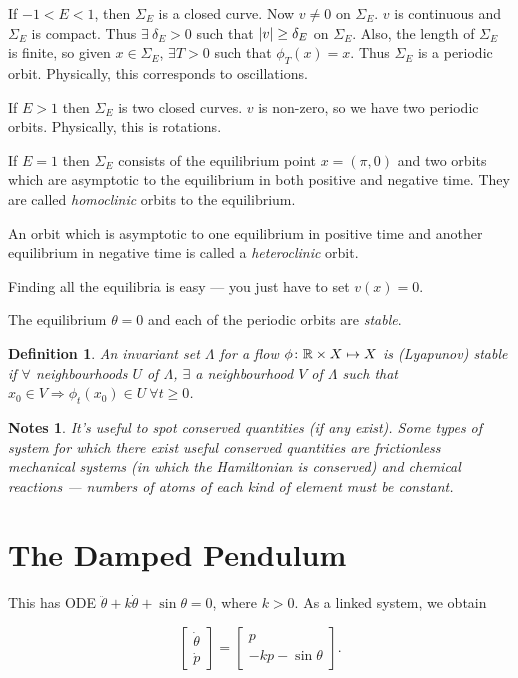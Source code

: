 \documentclass{notes}
\theoremstyle{plain}
\newtheorem*{definition}{Definition}
\newtheorem*{notes}{Notes}
\begin{document}
If $-1 < E < 1$, then $\Sigma_E$ is a closed curve.  Now $v \neq 0$ on
$\Sigma_E$.  $v$ is continuous and $\Sigma_E$ is compact.  Thus
$\exists\ \delta_E > 0$ such that $\left|v\right| \ge \delta_E$ on
$\Sigma_E$.  Also, the length of $\Sigma_E$ is finite, so given $x \in
\Sigma_E$, $\exists T > 0$ such that $\phi_T(x) = x$.  Thus $\Sigma_E$
is a periodic orbit.  Physically, this corresponds to oscillations.

If $E > 1$ then $\Sigma_E$ is two closed curves.  $v$ is non-zero, so
we have two periodic orbits.  Physically, this is rotations.

If $E = 1$ then $\Sigma_E$ consists of the equilibrium point $x =
(\pi,0)$ and two orbits which are asymptotic to the equilibrium in
both positive and negative time.  They are called \emph{homoclinic}
orbits to the equilibrium.

An orbit which is asymptotic to one equilibrium in positive time and
another equilibrium in negative time is called a \emph{heteroclinic}
orbit.

Finding all the equilibria is easy --- you just have to set $v(x) =
0$.

The equilibrium $\theta = 0$ and each of the periodic orbits are
\emph{stable}.

\begin{definition}
  An invariant set $\Lambda$ for a flow $\phi \colon \mathbb{R} \times X \mapsto X$
  is (Lyapunov) stable if $\forall$ neighbourhoods $U$ of $\Lambda$,
  $\exists$ a neighbourhood $V$ of $\Lambda$ such that $x_0 \in V
  \Rightarrow \phi_t(x_0) \in U\ \forall t \ge 0$.
\end{definition}

\begin{notes}
It's useful to spot conserved quantities (if any exist).  Some types
of system for which there exist useful conserved quantities are
frictionless mechanical systems (in which the Hamiltonian is
conserved) and chemical reactions --- numbers of atoms of each kind of
element must be constant.
\end{notes}

\section{The Damped Pendulum}

This has ODE $\ddot{\theta} + k \dot{\theta} + \sin \theta = 0$, where
$k > 0$.  As a linked system, we obtain

\[
\left[
\begin{matrix}
  \dot{\theta} \\ \dot{p}
\end{matrix}
\right] = \left[
\begin{matrix}
  p \\ - k p - \sin \theta
\end{matrix}
\right].
\]
\end{document}
